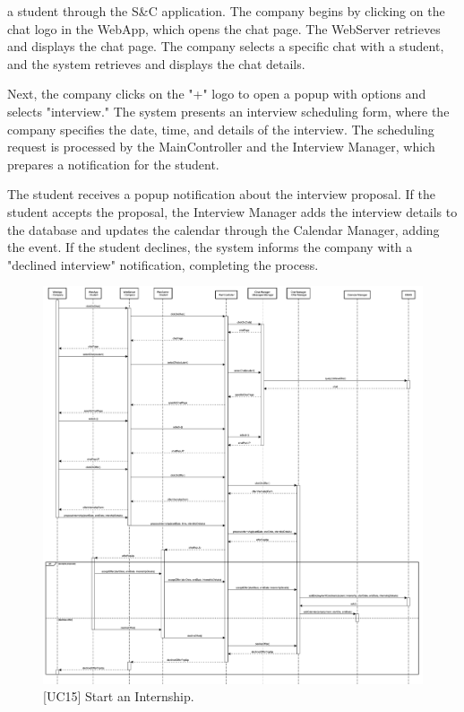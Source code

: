 a student through the S\&C application. The company begins by clicking on the chat logo in the WebApp, which opens the chat page. The WebServer retrieves and displays the chat page. The company selects a specific chat with a student, and the system retrieves and displays the chat details.

Next, the company clicks on the "+" logo to open a popup with options and selects "interview." The system presents an interview scheduling form, where the company specifies the date, time, and details of the interview. The scheduling request is processed by the MainController and the Interview Manager, which prepares a notification for the student.

The student receives a popup notification about the interview proposal. If the student accepts the proposal, the Interview Manager adds the interview details to the database and updates the calendar through the Calendar Manager, adding the event. If the student declines, the system informs the company with a "declined interview" notification, completing the process.

\begin{figure}[htbp]
    \centering
    \includegraphics[width=\linewidth]{DD/Images/sequenceDiagrams/startInternship.png}
    \caption{[UC15] Start an Internship.}
    \label{fig:startInternship_immagine}
\end{figure}
\clearpage


